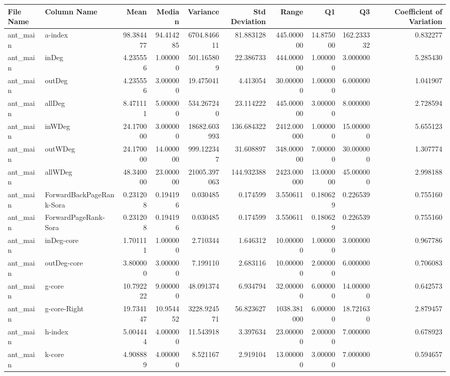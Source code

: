 \begin{tabular}{llrrrrrrrr}
\toprule
File Name & Column Name & Mean & Median & Variance & Std Deviation & Range & Q1 & Q3 & Coefficient of Variation \\
\midrule
ant_main & a-index & 98.384477 & 94.414285 & 6704.846611 & 81.883128 & 445.000000 & 14.875000 & 162.233332 & 0.832277 \\
ant_main & inDeg & 4.235556 & 1.000000 & 501.165809 & 22.386733 & 444.000000 & 1.000000 & 3.000000 & 5.285430 \\
ant_main & outDeg & 4.235556 & 3.000000 & 19.475041 & 4.413054 & 30.000000 & 1.000000 & 6.000000 & 1.041907 \\
ant_main & allDeg & 8.471111 & 5.000000 & 534.267240 & 23.114222 & 445.000000 & 3.000000 & 8.000000 & 2.728594 \\
ant_main & inWDeg & 24.170000 & 3.000000 & 18682.603993 & 136.684322 & 2412.000000 & 1.000000 & 15.000000 & 5.655123 \\
ant_main & outWDeg & 24.170000 & 14.000000 & 999.122347 & 31.608897 & 348.000000 & 7.000000 & 30.000000 & 1.307774 \\
ant_main & allWDeg & 48.340000 & 23.000000 & 21005.397063 & 144.932388 & 2423.000000 & 13.000000 & 45.000000 & 2.998188 \\
ant_main & ForwardBackPageRank-Sora & 0.231208 & 0.194196 & 0.030485 & 0.174599 & 3.550611 & 0.180629 & 0.226539 & 0.755160 \\
ant_main & ForwardPageRank-Sora & 0.231208 & 0.194196 & 0.030485 & 0.174599 & 3.550611 & 0.180629 & 0.226539 & 0.755160 \\
ant_main & inDeg-core & 1.701111 & 1.000000 & 2.710344 & 1.646312 & 10.000000 & 1.000000 & 3.000000 & 0.967786 \\
ant_main & outDeg-core & 3.800000 & 3.000000 & 7.199110 & 2.683116 & 10.000000 & 2.000000 & 6.000000 & 0.706083 \\
ant_main & g-core & 10.792222 & 9.000000 & 48.091374 & 6.934794 & 32.000000 & 6.000000 & 14.000000 & 0.642573 \\
ant_main & g-core-Right & 19.734147 & 10.954452 & 3228.924571 & 56.823627 & 1038.381000 & 6.000000 & 18.721630 & 2.879457 \\
ant_main & h-index & 5.004444 & 4.000000 & 11.543918 & 3.397634 & 23.000000 & 2.000000 & 7.000000 & 0.678923 \\
ant_main & k-core & 4.908889 & 4.000000 & 8.521167 & 2.919104 & 13.000000 & 3.000000 & 7.000000 & 0.594657 \\

\end{tabular}
